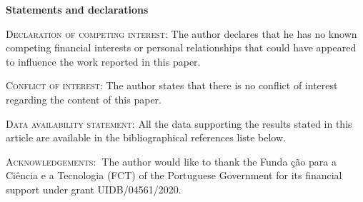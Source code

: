 \documentclass{article}
\begin{document}
\bigskip

\textbf{Statements and declarations}

\bigskip

\textsc{Declaration of competing interest:} The author declares that he has
no known competing financial interests or personal relationships that could
have appeared to influence the work reported in this paper.

\bigskip

\textsc{Conflict of interest:} The author states that there is no conflict
of interest regarding the content of this paper.

\bigskip

\textsc{Data availability statement:} All the data supporting the results
stated in this article are available in the bibliographical references liste
below.

\bigskip

\textsc{Acknowledgements:}\textbf{\ }The author would like to thank the Funda%
\c{c}\~{a}o para a Ci\^{e}ncia e a Tecnologia (FCT) of the Portuguese
Government for its financial support under grant UIDB/04561/2020.
\end{document}

